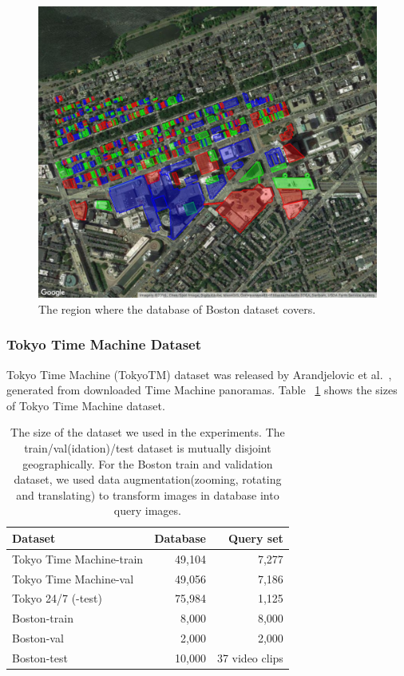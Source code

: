\begin{figure}[htbp]
\includegraphics[width=0.92\linewidth]{img/db_region}
\caption{The region where the database of Boston dataset covers. }
\label{fig:dbregion}
\end{figure}

\subsubsection{Tokyo Time Machine Dataset}
\par

Tokyo Time Machine (TokyoTM) dataset was released by Arandjelovic et al.~\cite{Arandjelovic16}, generated  from  downloaded  Time  Machine  panoramas. Table ~\ref{table:netvlad} shows  the  sizes  of  Tokyo Time Machine dataset. 

\begin{table}[htbp]
\begin{tabular}{l|rr}
Dataset & Database & Query set \\
\hline
\hline
Tokyo Time Machine-train & 49,104 & 7,277 \\
Tokyo Time Machine-val & 49,056 & 7,186 \\
Tokyo 24/7 (-test) & 75,984 & 1,125\\
\hline
Boston-train & 8,000 & 8,000 \\
Boston-val & 2,000 & 2,000 \\
Boston-test & 10,000 & 37 video clips
\end{tabular}
\caption{The size of the dataset we used in the experiments. The train/val(idation)/test dataset is mutually disjoint geographically. For the Boston train and validation dataset, we used data augmentation(zooming, rotating and translating) to transform images in database into query images. }
\label{table:netvlad}
\end{table}



